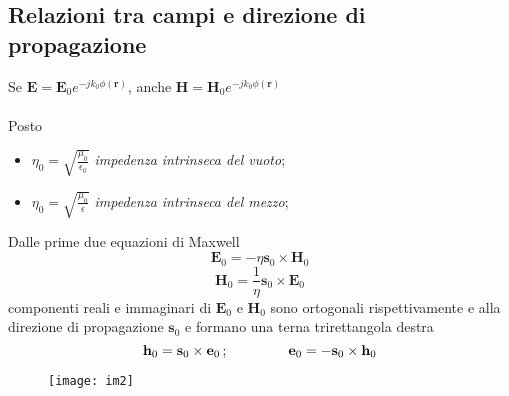 \documentclass[a4paper]{article}
\begin{document}
\subsection*{Relazioni tra campi e direzione di propagazione}
Se $\textbf{E}=\textbf{E}_0e^{-jk_0\phi(\textbf{r})}$, anche $\textbf{H}=\textbf{H}_0e^{-jk_0\phi(\textbf{r})}$\\\\
Posto
\begin{itemize}
\item $\eta_0=\sqrt{\frac{\mu_0}{\epsilon_0}}$ \emph{impedenza intrinseca del vuoto};
\item $\eta_0=\sqrt{\frac{\mu_0}{\epsilon}}$ \emph{impedenza intrinseca del mezzo};
\end{itemize}
Dalle prime due equazioni di Maxwell
\begin{equation*}
\textbf{E}_0=-\eta\textbf{s}_0\times\textbf{H}_0
\end{equation*}
\begin{equation*}
\textbf{H}_0=\frac{1}{\eta}\textbf{s}_0\times\textbf{E}_0
\end{equation*}
componenti reali e immaginari di $\textbf{E}_0$ e $\textbf{H}_0$ sono ortogonali rispettivamente e alla direzione di propagazione $\textbf{s}_0$ e formano una terna trirettangola destra
\begin{equation*}
\textbf{h}_0=\textbf{s}_0\times\textbf{e}_0\,;\hspace{15mm}\textbf{e}_0=-\textbf{s}_0\times\textbf{h}_0
\end{equation*}
\begin{figure}[ht] 
\centering
\texttt{[image: im2]}
\end{figure}
\end{document}
